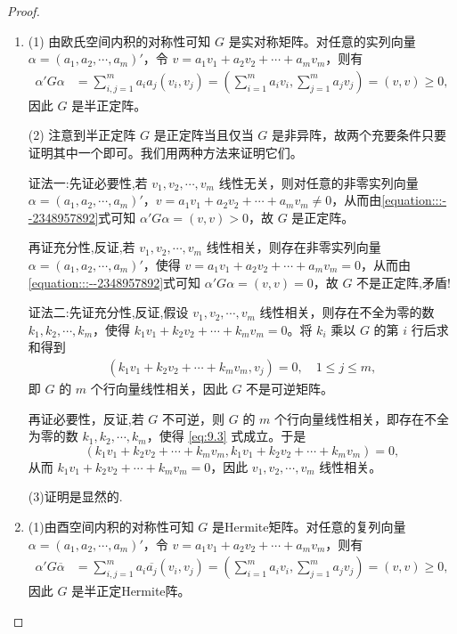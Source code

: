\documentclass[../../main.tex]{subfiles}
\begin{document}
\begin{proof}
\begin{enumerate}
\item (1) 由欧氏空间内积的对称性可知 $G$ 是实对称矩阵。对任意的实列向量 $\alpha=(a_1,a_2,\cdots,a_m)'$，令 $v = a_1v_1 + a_2v_2 + \cdots + a_mv_m$，则有
\begin{align}\label{equation:::--2348957892}
\alpha'G\alpha&=\sum_{i,j = 1}^{m}a_ia_j(v_i,v_j)=(\sum_{i = 1}^{m}a_iv_i,\sum_{j = 1}^{m}a_jv_j)=(v,v)\geq0,
\end{align}
因此 $G$ 是半正定阵。

(2) 注意到半正定阵 $G$ 是正定阵当且仅当 $G$ 是非异阵，故两个充要条件只要证明其中一个即可。我们用两种方法来证明它们。

{\color{blue}证法一:}先证必要性,若 $v_1,v_2,\cdots,v_m$ 线性无关，则对任意的非零实列向量 $\alpha=(a_1,a_2,\cdots,a_m)'$，$v = a_1v_1 + a_2v_2 + \cdots + a_mv_m\neq0$，从而由\eqref{equation:::--2348957892}式可知 $\alpha'G\alpha=(v,v)>0$，故 $G$ 是正定阵。

再证充分性,反证,若 $v_1,v_2,\cdots,v_m$ 线性相关，则存在非零实列向量 $\alpha=(a_1,a_2,\cdots,a_m)'$，使得 $v = a_1v_1 + a_2v_2 + \cdots + a_mv_m = 0$，从而由\eqref{equation:::--2348957892}式可知 $\alpha'G\alpha=(v,v)=0$，故 $G$ 不是正定阵,矛盾!

{\color{blue}证法二:}先证充分性,反证,假设 $v_1,v_2,\cdots,v_m$ 线性相关，则存在不全为零的数 $k_1,k_2,\cdots,k_m$，使得 $k_1v_1 + k_2v_2 + \cdots + k_mv_m = 0$。将 $k_i$ 乘以 $G$ 的第 $i$ 行后求和得到
\begin{align}
(k_1v_1 + k_2v_2 + \cdots + k_mv_m,v_j)=0,\quad 1\leq j\leq m,\label{eq:9.3}
\end{align}
即 $G$ 的 $m$ 个行向量线性相关，因此 $G$ 不是可逆矩阵。

再证必要性，反证,若 $G$ 不可逆，则 $G$ 的 $m$ 个行向量线性相关，即存在不全为零的数 $k_1,k_2,\cdots,k_m$，使得 \eqref{eq:9.3} 式成立。于是
\[
(k_1v_1 + k_2v_2 + \cdots + k_mv_m,k_1v_1 + k_2v_2 + \cdots + k_mv_m)=0,
\]
从而 $k_1v_1 + k_2v_2 + \cdots + k_mv_m = 0$，因此 $v_1,v_2,\cdots,v_m$ 线性相关。

(3)证明是显然的.

\item (1)由酉空间内积的对称性可知 $G$ 是Hermite矩阵。对任意的复列向量 $\alpha=(a_1,a_2,\cdots,a_m)'$，令 $v = a_1v_1 + a_2v_2 + \cdots + a_mv_m$，则有
\begin{align}\label{equation:::--234895789}
\alpha'G \overline{\alpha}&=\sum_{i,j = 1}^{m}a_i\overline{a_j}(v_i,v_j)=(\sum_{i = 1}^{m}a_iv_i,\sum_{j = 1}^{m}a_jv_j)=(v,v)\geq0,
\end{align}
因此 $G$ 是半正定Hermite阵。


\end{enumerate}
\end{proof}
\end{document}
